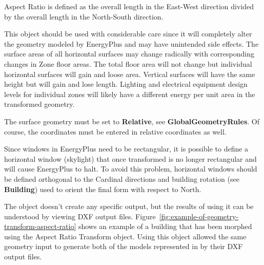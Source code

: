 Aspect Ratio is defined as the overall length in the East-West direction divided by the overall length in the North-South direction.

This object should be used with considerable care since it will completely alter the geometry modeled by EnergyPlus and may have unintended side effects. The surface areas of all horizontal surfaces may change radically with corresponding changes in Zone floor areas. The total floor area will not change but individual horizontal surfaces will gain and loose area. Vertical surfaces will have the same height but will gain and lose length. Lighting and electrical equipment design levels for individual zones will likely have a different energy per unit area in the transformed geometry.

The surface geometry must be set to \textbf{Relative}, see \textbf{GlobalGeometryRules}. Of course, the coordinates must be entered in relative coordinates as well.

Since windows in EnergyPlus need to be rectangular, it is possible to define a horizontal window (skylight) that once transformed is no longer rectangular and will cause EnergyPlus to halt. To avoid this problem, horizontal windows should be defined orthogonal to the Cardinal directions and building rotation (see \textbf{Building}) used to orient the final form with respect to North.

The object doesn't create any specific output, but the results of using it can be understood by viewing DXF output files. Figure~\ref{fig:example-of-geometry-transform-aspect-ratio} shows an example of a building that has been morphed using the Aspect Ratio Transform object. Using this object allowed the same geometry input to generate both of the models represented in by their DXF output files.

